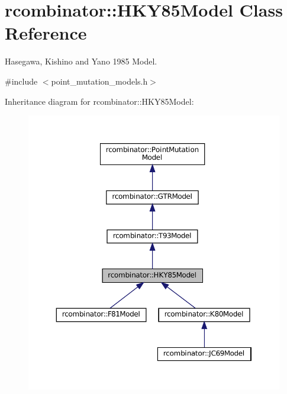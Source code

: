 \hypertarget{classrcombinator_1_1HKY85Model}{}\section{rcombinator\+:\+:H\+K\+Y85\+Model Class Reference}
\label{classrcombinator_1_1HKY85Model}


Hasegawa, Kishino and Yano 1985 Model.  




{\ttfamily \#include $<$point\+\_\+mutation\+\_\+models.\+h$>$}



Inheritance diagram for rcombinator\+:\+:H\+K\+Y85\+Model\+:\nopagebreak
\begin{figure}[H]
\begin{center}
\leavevmode
\includegraphics[width=350pt]{classrcombinator_1_1HKY85Model__inherit__graph}
\end{center}
\end{figure}


